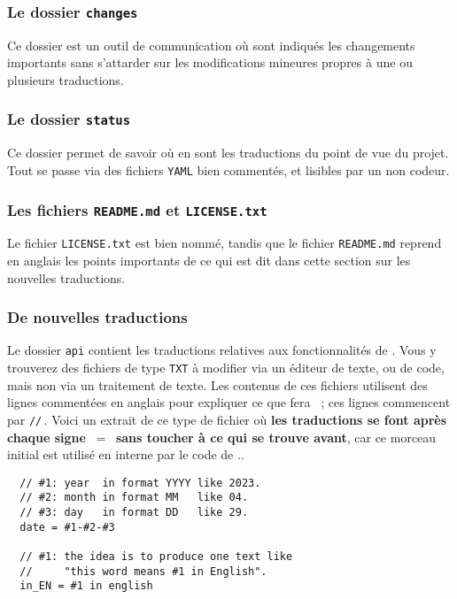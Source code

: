 \subsubsection{Le dossier \texttt{changes}}

Ce dossier est un outil de communication où sont indiqués les changements importants sans s'attarder sur les modifications mineures propres à une ou plusieurs traductions.



\subsubsection{Le dossier \texttt{status}}

Ce dossier permet de savoir où en sont les traductions du point de vue du projet. Tout se passe via des fichiers \verb#YAML# bien commentés, et lisibles par un non codeur.



\subsubsection{Les fichiers \texttt{README.md} et \texttt{LICENSE.txt}}

Le fichier \texttt{LICENSE.txt} est bien nommé, tandis que le fichier \texttt{README.md} reprend en anglais les points importants de ce qui est dit dans cette section sur les nouvelles traductions.



\subsubsection{De nouvelles traductions}
\label{tutodoc-contrib-translate}

\begin{tdocimp}
    Le dossier \verb#api# contient les traductions relatives aux fonctionnalités de \thisproj.
    Vous y trouverez des fichiers de type \verb#TXT# à modifier via un éditeur de texte, ou de code, mais non via un traitement de texte.
    Les contenus de ces fichiers utilisent des lignes commentées en anglais pour expliquer ce que fera \thisproj\ ; ces lignes commencent par \verb#//#\,. Voici un extrait de ce type de fichier où \textbf{les traductions se font après chaque signe \,$=$\, sans toucher à ce qui se trouve avant}, car ce morceau initial est utilisé en interne par le code de \thisproj..

    \tdocsep
    \vspace{-10pt}
    \begin{verbatim}
  // #1: year  in format YYYY like 2023.
  // #2: month in format MM   like 04.
  // #3: day   in format DD   like 29.
  date = #1-#2-#3

  // #1: the idea is to produce one text like
  //     "this word means #1 in English".
  in_EN = #1 in english\end{verbatim}
\end{tdocimp}


